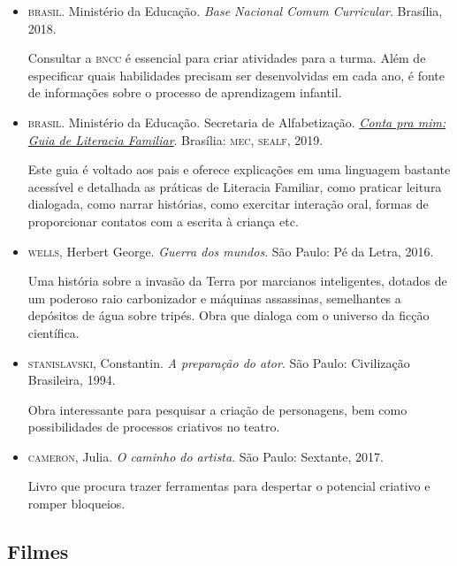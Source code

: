 \documentclass[11pt]{extarticle}
\begin{document}
\begin{itemize}
\item \textsc{brasil}. Ministério da Educação. \textit{Base Nacional Comum Curricular}. Brasília, 2018.

Consultar a \textsc{bncc} é essencial para criar atividades para a turma. Além de especificar quais habilidades precisam ser desenvolvidas em cada ano, é fonte de informações sobre o processo de aprendizagem infantil. 

\item \textsc{brasil}. Ministério da Educação. Secretaria de Alfabetização. \href{http://alfabetizacao.mec.gov.br/images/conta-pra-mim/conta-pra-mim-literacia.pdf}{\textit{Conta pra mim: Guia de Literacia Familiar}}. 
Brasília: \textsc{mec, sealf}, 2019. 

Este guia é voltado aos pais e oferece explicações em uma linguagem bastante acessível e detalhada as práticas de Literacia Familiar, como praticar leitura dialogada, como narrar histórias, como exercitar interação oral, formas de proporcionar contatos com a escrita à criança etc. 
 
\item \textsc{wells}, Herbert George. \textit{Guerra dos mundos}. São Paulo: Pé da Letra, 2016.

Uma história sobre a invasão da Terra por marcianos inteligentes, dotados de um poderoso raio carbonizador e máquinas assassinas, semelhantes a depósitos de água sobre tripés. Obra que dialoga com o universo da ficção científica.

\item \textsc{stanislavski}, Constantin. \textit{A preparação do ator}. São Paulo: Civilização Brasileira, 1994.

Obra interessante para pesquisar a criação de personagens, bem como possibilidades de processos criativos no teatro. 

\item \textsc{cameron}, Julia. \textit{O caminho do artista}. São Paulo: Sextante, 2017.

Livro que procura trazer ferramentas para despertar o potencial criativo e romper bloqueios.

\end{itemize}

\subsection{Filmes}
\end{document}
